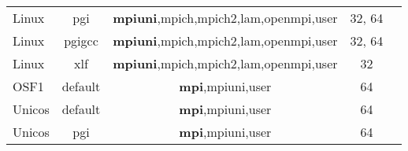 \begin{tabular}{lcccc}
Linux   &  pgi          &  {\bf mpiuni},mpich,mpich2,lam,openmpi,user  &  32, 64  \\
Linux   &  pgigcc       &  {\bf mpiuni},mpich,mpich2,lam,openmpi,user  &  32, 64  \\
Linux   &  xlf          &  {\bf mpiuni},mpich,mpich2,lam,openmpi,user  &  32  \\
OSF1    &  default      &  {\bf mpi},mpiuni,user         &  64  \\
Unicos  &  default      &  {\bf mpi},mpiuni,user         &  64  \\
Unicos  &  pgi          &  {\bf mpi},mpiuni,user         &  64

\end{tabular}

\vspace{1ex}


